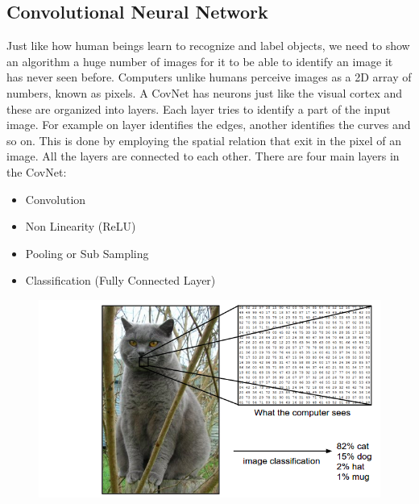 \documentclass[12pt, a4paper,oneside]{report}
\begin{document}
\subsection{Convolutional Neural Network}
Just like how human beings learn to recognize and label objects, we need to show an algorithm a huge number of images for it to be able to identify an image it has never seen before. Computers unlike humans perceive images as a 2D array of numbers, known as pixels. A CovNet has neurons just like the visual cortex and these are organized into layers. Each layer tries to identify a part of the input image. For example on layer identifies the edges, another identifies the curves and so on. This is done by employing the spatial relation that exit in the pixel of an image. All the layers are connected to each other. There are four main layers in the CovNet:

\begin{itemize}
	\item Convolution
	\item Non Linearity (ReLU)
	\item Pooling or Sub Sampling
	\item Classification (Fully Connected Layer)
\end{itemize} 


\begin{figure}[htb!]
	\includegraphics [scale=0.5] {cat}
	\label{fig:cat}
\end{figure}
\end{document}
